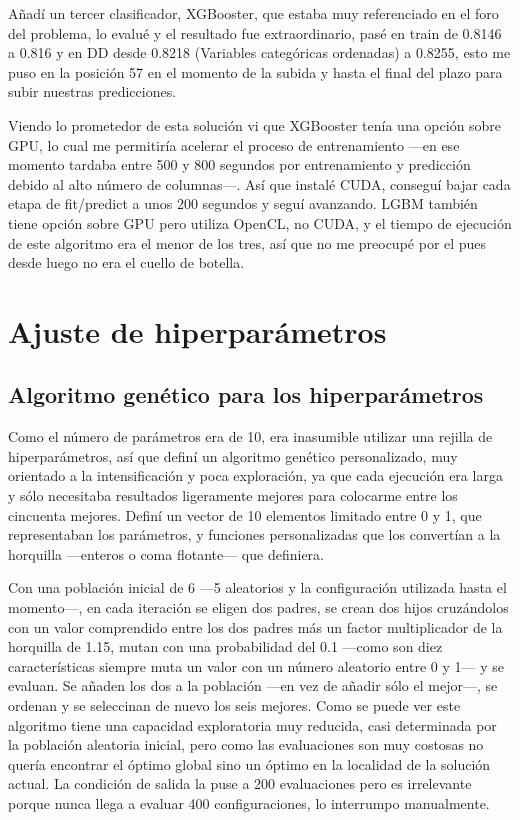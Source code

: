 \documentclass{article}
\begin{document}
Añadí un tercer clasificador, XGBooster, que estaba muy referenciado en el foro del problema, lo evalué y el resultado fue extraordinario, pasé en train de 0.8146 a 0.816 y en DD desde 0.8218 (Variables categóricas ordenadas) a 0.8255, esto me puso en la posición 57 en el momento de la subida y hasta el final del plazo para subir nuestras predicciones. 

Viendo lo prometedor de esta solución vi que XGBooster tenía una opción sobre GPU, lo cual me permitiría acelerar el proceso de entrenamiento ---en ese momento tardaba entre 500 y 800 segundos por entrenamiento y predicción debido al alto número de columnas---. Así que instalé CUDA, conseguí bajar cada etapa de fit/predict a unos 200 segundos y seguí avanzando. LGBM también tiene opción sobre GPU pero utiliza OpenCL, no CUDA, y el tiempo de ejecución de este algoritmo era el menor de los tres, así que no me preocupé por el pues desde luego no era el cuello de botella.

\section{Ajuste de hiperparámetros}

\subsection{Algoritmo genético para los hiperparámetros}

Como el número de parámetros era de 10, era inasumible utilizar una rejilla de hiperparámetros, así que definí un algoritmo genético personalizado, muy orientado a la intensificación y poca exploración, ya que cada ejecución era larga y sólo necesitaba resultados ligeramente mejores para colocarme entre los cincuenta mejores. Definí un vector de 10 elementos limitado entre 0 y 1, que representaban los parámetros, y funciones personalizadas que los convertían a la horquilla ---enteros o coma flotante--- que definiera. 

Con una población inicial de 6 ---5 aleatorios y la configuración utilizada hasta el momento---, en cada iteración se eligen dos padres, se crean dos hijos cruzándolos con un valor comprendido entre los dos padres más un factor multiplicador de la horquilla de 1.15, mutan con una probabilidad del 0.1 ---como son diez características siempre muta un valor con un número aleatorio entre 0 y 1--- y se evaluan. Se añaden los dos a la población ---en vez de añadir sólo el mejor---, se ordenan y se seleccinan de nuevo los seis mejores. Como se puede ver este algoritmo tiene una capacidad exploratoria muy reducida, casi determinada por la población aleatoria inicial, pero como las evaluaciones son muy costosas no quería encontrar el óptimo global sino un óptimo en la localidad de la solución actual. La condición de salida la puse a 200 evaluaciones pero es irrelevante porque nunca llega a evaluar 400 configuraciones, lo interrumpo manualmente.
\end{document}
